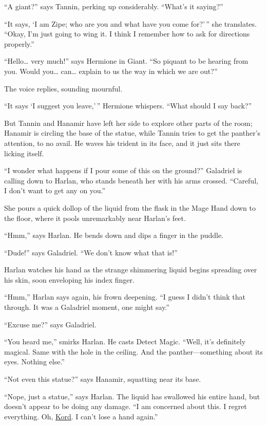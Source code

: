 \documentclass[smalldemyvopaper,11pt,twoside,onecolumn,openright,extrafontsizes]{memoir}
\begin{document}
``A giant?'' says Tannin, perking up considerably. ``What's it saying?''

``It says, `I am Zipe; who are you and what have you come for?'\,'' she
translates. ``Okay, I'm just going to wing it. I think I remember how to
ask for directions properly.''

``Hello\ldots{} very much!'' says Hermione in Giant. ``So piquant to be
hearing from you. Would you\ldots{} can\ldots{} explain to us the way in
which we are out?''

The voice replies, sounding mournful.

``It says `I suggest you leave,'\,'' Hermione whispers. ``What should I
say back?''

But Tannin and Hanamir have left her side to explore other parts of the
room; Hanamir is circling the base of the statue, while Tannin tries to
get the panther's attention, to no avail. He waves his trident in its
face, and it just sits there licking itself.

``I wonder what happens if I pour some of this on the ground?''
Galadriel is calling down to Harlan, who stands beneath her with his
arms crossed. ``Careful, I don't want to get any on you.''

She pours a quick dollop of the liquid from the flask in the Mage Hand
down to the floor, where it pools unremarkably near Harlan's feet.

``Hmm,'' says Harlan. He bends down and dips a finger in the puddle.

``Dude!'' says Galadriel. ``We don't know what that is!''

Harlan watches his hand as the strange shimmering liquid begins
spreading over his skin, soon enveloping his index finger.

``Hmm,'' Harlan says again, his frown deepening. ``I guess I didn't
think that through. It was a Galadriel moment, one might say.''

``Excuse me?'' says Galadriel.

``You heard me,'' smirks Harlan. He casts Detect Magic. ``Well, it's
definitely magical. Same with the hole in the ceiling. And the
panther---something about its eyes. Nothing else.''

``Not even this statue?'' says Hanamir, squatting near its base.

``Nope, just a statue,'' says Harlan. The liquid has swallowed his
entire hand, but doesn't appear to be doing any damage. ``I am concerned
about this. I regret everything. Oh, \href{/characters/kord/}{Kord}. I
can't lose a hand again.''
\end{document}
